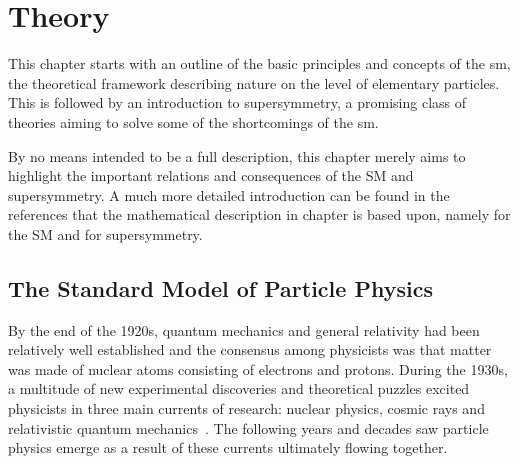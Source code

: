 
\chapter{Theory}

\ifpdf
    \graphicspath{{chapter-theory/Figs/Raster/}{chapter-theory/Figs/PDF/}{chapter-theory/Figs/}}
\else
    \graphicspath{{chapter-theory/Figs/Vector/}{chapter-theory/Figs/}}
\fi

This chapter starts with an outline of the basic principles and concepts of the \gls{sm}, the theoretical framework describing nature on the level of elementary particles. This is followed by an introduction to supersymmetry, a promising class of theories aiming to solve some of the shortcomings of the \gls{sm}.

By no means intended to be a full description, this chapter merely aims to highlight the important relations and consequences of the SM and supersymmetry. A much more detailed introduction can be found in the references that the mathematical description in chapter is based upon, namely \cite{Brock:1354959, Peskin:1995ev} for the SM and \cite{Martin:1997ns,Bustamante:2009us} for supersymmetry.

\section{The Standard Model of Particle Physics}


By the end of the 1920s, quantum mechanics and general relativity had been relatively well established and the consensus among physicists was that matter was made of nuclear atoms consisting of electrons and protons. During the 1930s, a multitude of new experimental discoveries and theoretical puzzles excited physicists in three main currents of research: nuclear physics, cosmic rays and relativistic quantum mechanics~\cite{brown1986the}. The following years and decades saw particle physics emerge as a result of these currents ultimately flowing together.

